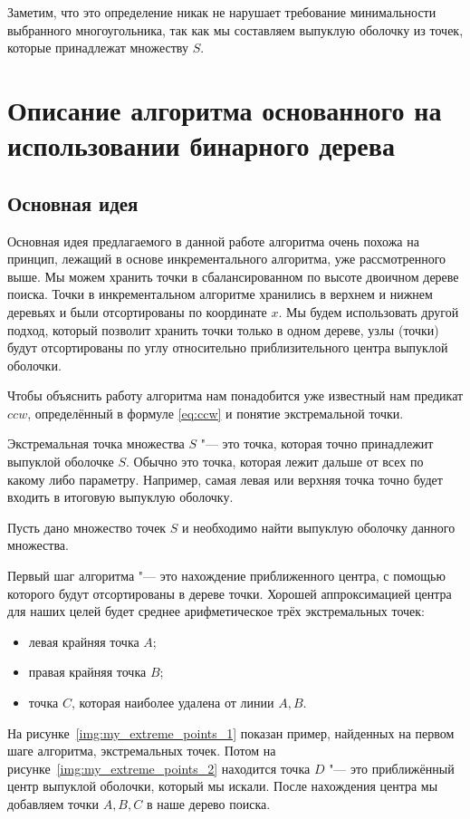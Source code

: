 Заметим, что это определение никак не нарушает требование минимальности выбранного многоугольника, так как мы составляем выпуклую оболочку из точек, которые принадлежат множеству $S$.

\section{Описание алгоритма основанного на использовании бинарного дерева} \label{sect2_2}

\subsection{Основная идея} \label{subsect2_2_1}

Основная идея предлагаемого в данной работе алгоритма очень похожа на принцип, лежащий в основе инкрементального алгоритма, уже рассмотренного выше. Мы можем хранить точки в сбалансированном по высоте двоичном дереве поиска. Точки в инкрементальном алгоритме хранились в верхнем и нижнем деревьях и были отсортированы по координате $x$. Мы будем использовать другой подход, который позволит хранить точки только в одном дереве, узлы (точки) будут отсортированы по углу относительно приблизительного центра выпуклой оболочки.

Чтобы объяснить работу алгоритма нам понадобится уже известный нам предикат $ccw$, определённый в формуле \eqref{eq:ccw} и понятие экстремальной точки.

Экстремальная точка множества $S$ "--- это точка, которая точно принадлежит выпуклой оболочке $S$. Обычно это точка, которая лежит дальше от всех по какому либо параметру. Например, самая левая или верхняя точка точно будет входить в итоговую выпуклую оболочку.

Пусть дано множество точек $S$ и необходимо найти выпуклую оболочку данного множества.

Первый шаг алгоритма "--- это нахождение приближенного центра, с помощью которого будут отсортированы в дереве точки. Хорошей аппроксимацией центра для наших целей будет среднее арифметическое трёх экстремальных точек:
\begin{itemize}
	\item левая крайняя точка $A$;
	\item правая крайняя точка $B$;
	\item точка $C$, которая наиболее удалена от линии $A,B$.
\end{itemize}

На рисунке~\ref{img:my_extreme_points_1} показан пример, найденных на первом шаге алгоритма, экстремальных точек. Потом на рисунке~\ref{img:my_extreme_points_2} находится точка $D$ "--- это приближённый центр выпуклой оболочки, который мы искали. После нахождения центра мы добавляем точки $A, B, C$ в наше дерево поиска.

